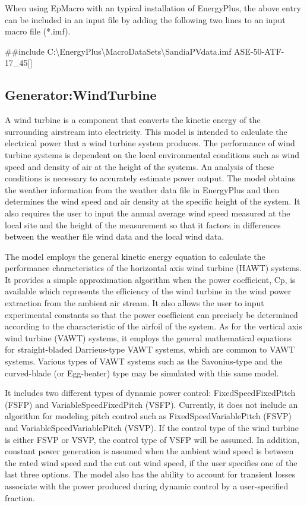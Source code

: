When using EpMacro with an typical installation of EnergyPlus, the above entry can be included in an input file by adding the following two lines to an input macro file (*.imf).

\#\#include C:\textbackslash{}EnergyPlus\textbackslash{}MacroDataSets\textbackslash{}SandiaPVdata.imf ASE-50-ATF-17\_45{[]}

\subsection{Generator:WindTurbine}\label{generatorwindturbine}

A wind turbine is a component that converts the kinetic energy of the surrounding airstream into electricity. This model is intended to calculate the electrical power that a wind turbine system produces. The performance of wind turbine systems is dependent on the local environmental conditions such as wind speed and density of air at the height of the systems. An analysis of these conditions is necessary to accurately estimate power output. The model obtains the weather information from the weather data file in EnergyPlus and then determines the wind speed and air density at the specific height of the system. It also requires the user to input the annual average wind speed measured at the local site and the height of the measurement so that it factors in differences between the weather file wind data and the local wind data.

The model employs the general kinetic energy equation to calculate the performance characteristics of the horizontal axis wind turbine (HAWT) systems. It provides a simple approximation algorithm when the power coefficient, Cp, is available which represents the efficiency of the wind turbine in the wind power extraction from the ambient air stream. It also allows the user to input experimental constants so that the power coefficient can precisely be determined according to the characteristic of the airfoil of the system. As for the vertical axis wind turbine (VAWT) systems, it employs the general mathematical equations for straight-bladed Darrieus-type VAWT systems, which are common to VAWT systems. Various types of VAWT systems such as the Savonius-type and the curved-blade (or Egg-beater) type may be simulated with this same model.

It includes two different types of dynamic power control: FixedSpeedFixedPitch (FSFP) and VariableSpeedFixedPitch (VSFP). Currently, it does not include an algorithm for modeling pitch control such as FixedSpeedVariablePitch (FSVP) and VariableSpeedVariablePitch (VSVP). If the control type of the wind turbine is either FSVP or VSVP, the control type of VSFP will be assumed. In addition, constant power generation is assumed when the ambient wind speed is between the rated wind speed and the cut out wind speed, if the user specifies one of the last three options. The model also has the ability to account for transient losses associate with the power produced during dynamic control by a user-specified fraction.


